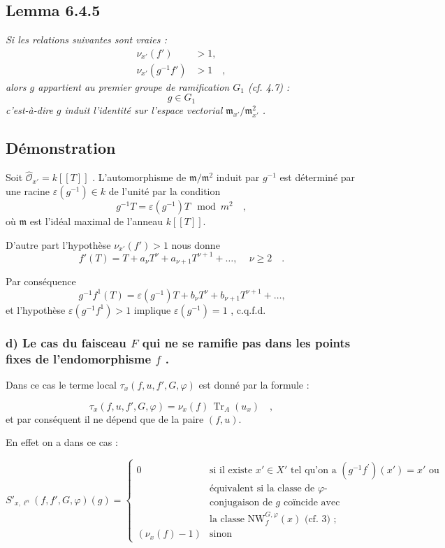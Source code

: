 \documentclass[11pt]{article}
\providecommand{\fm}{\mathfrak{m}}
\providecommand{\Tr}{\operatorname{Tr}}
\providecommand{\Tr}{\operatorname{Tr}}
\providecommand{\Tr}{\operatorname{Tr}}
\providecommand{\Tr}{\operatorname{Tr}}
\providecommand{\fm}{\mathfrak m}
\providecommand{\Tr}{\operatorname{Tr}}
\begin{document}
\subsection*{Lemma 6.4.5}
\emph{Si les relations suivantes sont vraies :}
\begin{align*}
\nu_{x'}(f') &> 1 \text{,} \\
\nu_{x'}(g^{-1}f') &> 1 \quad ,
\end{align*}
\emph{alors $g$ appartient au premier groupe de ramification $G_1$ (cf. 4.7) :}
\[
g \in G_1
\]
\emph{c'est-à-dire $g$ induit l'identité sur l'espace vectorial $\fm_{x'}/\fm_{x'}^2$ .}

\subsection*{Démonstration}
Soit $\widehat{\mathcal{O}}_{x'} = k[[T]]$ . L'automorphisme de $\fm/\fm^2$ induit par $g^{-1}$ est déterminé par une racine $\varepsilon(g^{-1}) \in k$ de l'unité par la condition
\[
g^{-1}T = \varepsilon(g^{-1})T \mod m^2 \quad ,
\]
où $\fm$ est l'idéal maximal de l'anneau $k[[T]]$.

D'autre part l'hypothèse $\nu_{x'}(f') > 1$ nous donne
\[
f'(T) = T + a_\nu T^\nu + a_{\nu+1} T^{\nu+1} + \ldots \text{, } \quad \nu \geq 2 \quad .
\]

Par conséquence
\[
g^{-1}f^{1}(T) = \varepsilon(g^{-1})T + b_\nu T^\nu + b_{\nu+1} T^{\nu+1} + \ldots \text{,}
\]
et l'hypothèse $\varepsilon(g^{-1}f^{1}) > 1$ implique $\varepsilon(g^{-1}) = 1$ , c.q.f.d.

\subsubsection*{d) Le cas du faisceau $F$ qui ne se ramifie pas dans les points fixes de l'endomorphisme $f$ .}

Dans ce cas le terme local $\tau_x(f,u, f', G, \varphi)$ est donné par la formule :

\begin{equation}\tag{6.4.6}
\tau_x(f,u, f', G, \varphi) = \nu_x(f) \, \Tr_A(u_x) \quad ,
\end{equation}
et par conséquent il ne dépend que de la paire $(f,u)$.

En effet on a dans ce cas :

\begin{equation}\tag{6.4.7}
S'_{x,\ell^n}(f, f', G, \varphi)(g) = \begin{cases}
0 & \text{si il existe } x' \in X' \text{ tel qu'on a } (g^{-1}f^{\prime})(x') = x' \text{ ou}\\
& \text{équivalent si la classe de $\varphi$-}\\
& \text{conjugaison de $g$ coïncide avec}\\
& \text{la classe } \mathrm{NW}_{f}^{G,\varphi}(x) \text{ (cf. 3) ;}\\
(\nu_x(f)-1) & \text{sinon}
\end{cases}
\end{equation}
\end{document}
